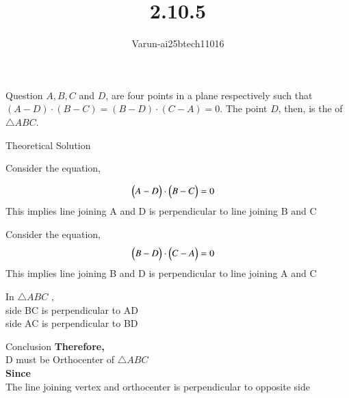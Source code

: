 \documentclass{beamer}
\title %
{2.10.5}
\author %
{Varun-ai25btech11016}
\begin{document}
\frame{\titlepage}
\begin{frame}{Question}
$A, B, C$ and $D$, are four points in a plane respectively such that 
$(A - D) \cdot (B - C) = (B - D) \cdot (C - A) = 0.$  
The point $D$, then, is the \underline{\hspace{1cm}} of $\triangle ABC$. 
\end{frame}



\begin{frame}{Theoretical Solution }

Consider the equation,

\begin{align}
\begin{pmatrix}A - D\end{pmatrix} \cdot \begin{pmatrix}B - C\end{pmatrix}
&=0
\end{align}
This implies line joining A and D is perpendicular to line joining B and C


Consider the equation,
\begin{align}
\begin{pmatrix}B - D\end{pmatrix} \cdot \begin{pmatrix}C - A\end{pmatrix}
&=0
\end{align}
This implies line joining B and D is perpendicular to line joining A and C

In $\triangle ABC$ ,\\
  side BC is perpendicular to AD\\
side AC is perpendicular to BD\\
\end{frame}
\begin{frame}{Conclusion}
\textbf{Therefore,}\\
D must be Orthocenter of $\triangle ABC$\\
\textbf{Since}\\
The line joining vertex and orthocenter is perpendicular to opposite side
\end{frame}
\end{document}
